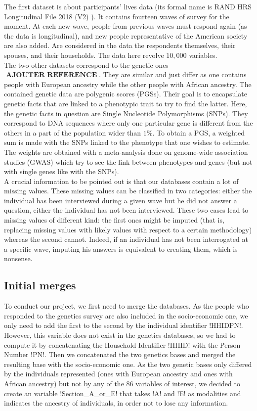 \documentclass[]{article}
\DeclareMathOperator*{\addref}{\textbf{AJOUTER REFERENCE}}
\begin{document}
\noindent
The first dataset is about participants’ lives data (its formal name is RAND HRS Longitudinal File 2018 (V2) \cite{hrs2014}). It contains fourteen waves of survey for the moment. At each new wave, people from previous waves must respond again (as the data is longitudinal), and new people representative of the American society are also added. Are considered in the data the respondents themselves, their spouses, and their households. The data here revolve $10,000$ variables.\\

\noindent
The two other datasets correspond to the genetic ones $\addref$. They are similar and just differ as one contains people with European ancestry while the other people with African ancestry. The contained genetic data are polygenic scores (PGSs). Their goal is to encapsulate genetic facts that are linked to a phenotypic trait to try to find the latter. Here, the genetic facts in question are Single Nucleotide Polymorphisms (SNPs). They correspond to DNA sequences where only one particular gene is different from the others in a part of the population wider than $1$\%. To obtain a PGS, a weighted sum is made with the SNPs linked to the phenotype that one wishes to estimate. The weights are obtained with a meta-analysis done on genome-wide association studies (GWAS) which try to see the link between phenotypes and genes (but not with single genes like with the SNPs).\\

\noindent
A crucial information to be pointed out is that our databases contain a lot of missing values. These missing values can be classified in two categories: either the individual has been interviewed during a given wave but he did not answer a question, either the individual has not been interviewed. These two cases lead to missing values of different kind: the first ones might be imputed (that is, replacing missing values with likely values with respect to a certain methodology) whereas the second cannot. Indeed, if an individual has not been interrogated at a specific wave, imputing his answers is equivalent to creating them, which is nonsense.

\subsection{Initial merges}
To conduct our project, we first need to merge the databases. As the people who responded to the genetics survey are also included in the socio-economic one, we only need to add the first to the second by the individual identifier \pyth!HHIDPN!. However, this variable does not exist in the genetics databases, so we had to compute it by concatenating the Household Identifier \pyth!HHID! with the Person Number \pyth!PN!. Then we concatenated the two genetics bases and merged the resulting base with the socio-economic one. As the two genetic bases only differed by the individuals represented (ones with European ancestry and ones with African ancestry) but not by any of the $86$ variables of interest, we decided to create an  variable \pyth!Section_A_or_E! that takes \pyth!A! and \pyth!E! as modalities and indicates the ancestry of individuals, in order not to lose any information.
\end{document}
